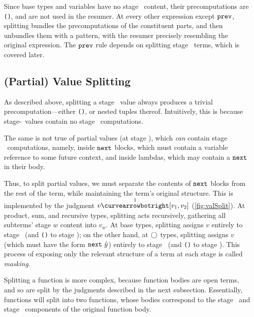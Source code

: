Since base types and variables have no stage \bbone\ content, their
precomputations are \texttt{()}, and are not used in the resumer. At every other
expression except ${\tt prev}$, splitting bundles the precomputations of the
constituent parts, and then unbundles them with a pattern, with the resumer
precisely resembling the original expression. The ${\tt prev}$ rule depends on
splitting stage \bbone\ terms, which is covered later.


\subsection{(Partial) Value Splitting}

As described above, splitting a stage \bbtwo\ value always produces a trivial
precomputation---either \texttt{()}, or nested tuples thereof. Intuitively,
this is because stage-\bbtwo\ values contain no stage \bbone\ computations.

The same is not true of partial values (at stage \bbone), which \emph{can}
contain stage \bbtwo\ computations, namely, inside ${\tt next}$ blocks, which must
contain a variable reference to some future context, and inside lambdas, which
may contain a ${\tt next}$ in their body.

Thus, to split partial values, we must separate the contents of ${\tt next}$ blocks
from the rest of the term, while maintaining the term's original structure. This
is implemented by the judgment $v \vsplito [v_1,v_2]$ (\ref{fig:valSplit}).
At product, sum, and recursive types, splitting acts recursively, gathering all
subterms' stage $w$ content into $v_w$.
At base types, splitting assigns $v$ entirely to stage \bbone\ (and \texttt{()}
to stage \bbtwo);
on the other hand, at $\bigcirc$ types, splitting assigns $v$ (which must have the
form ${\tt next}~\hat y$) entirely to stage \bbtwo\ (and \texttt{()} to stage
\bbone).
This process of exposing only the relevant structure of a term at each stage is
called \emph{masking}.


Splitting a function is more complex, because function bodies are open terms,
and so are split by the judgments described in the next subsection. Essentially,
functions will split into two functions, whose bodies correspond to the stage
\bbone\ and stage \bbtwo\ components of the original function body.


